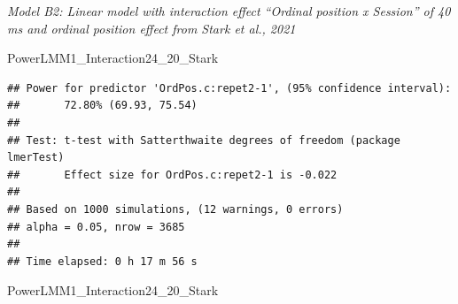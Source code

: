 \documentclass[
]{article}
\newenvironment{Shaded}{\begin{snugshade}}{\end{snugshade}}
\newcommand{\AttributeTok}[1]{\textcolor[rgb]{0.77,0.63,0.00}{#1}}
\newcommand{\CommentTok}[1]{\textcolor[rgb]{0.56,0.35,0.01}{\textit{#1}}}
\newcommand{\FunctionTok}[1]{\textcolor[rgb]{0.00,0.00,0.00}{#1}}
\newcommand{\NormalTok}[1]{#1}
\newcommand{\OtherTok}[1]{\textcolor[rgb]{0.56,0.35,0.01}{#1}}
\newcommand{\SpecialCharTok}[1]{\textcolor[rgb]{0.00,0.00,0.00}{#1}}
\newcommand{\StringTok}[1]{\textcolor[rgb]{0.31,0.60,0.02}{#1}}
\begin{document}
\emph{Model B2: Linear model with interaction effect ``Ordinal position
x Session'' of 40 ms and ordinal position effect from Stark et al.,
2021}

\begin{Shaded}
\end{Shaded}

\begin{Shaded}
\begin{Highlighting}[]
\NormalTok{PowerLMM1\_Interaction24\_20\_Stark}
\end{Highlighting}
\end{Shaded}

\begin{verbatim}
## Power for predictor 'OrdPos.c:repet2-1', (95% confidence interval):
##       72.80% (69.93, 75.54)
## 
## Test: t-test with Satterthwaite degrees of freedom (package lmerTest)
##       Effect size for OrdPos.c:repet2-1 is -0.022
## 
## Based on 1000 simulations, (12 warnings, 0 errors)
## alpha = 0.05, nrow = 3685
## 
## Time elapsed: 0 h 17 m 56 s
\end{verbatim}

\begin{Shaded}
\end{Shaded}

\begin{Shaded}
\begin{Highlighting}[]
\NormalTok{PowerLMM1\_Interaction24\_20\_Stark}
\end{Highlighting}
\end{Shaded}
\end{document}
